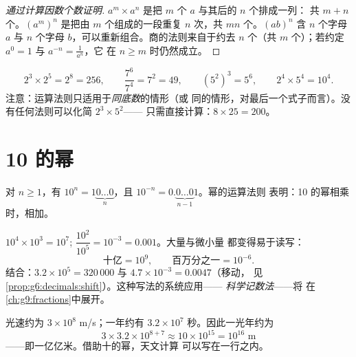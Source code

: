 \begin{proof}[通过计算因数个数证明]
$a^m \times a^n$ 是把 $m$ 个 $a$ 与其后的 $n$ 个排成一列：
共 $m + n$ 个。$\left(a^m\right)^n$ 是把由 $m$ 个组成的一段重复
$n$ 次，共 $mn$ 个。$(ab)^n$ 含 $n$ 个字母 $a$ 与 $n$
个字母 $b$，可以重新组合。商的法则来自于约去
$n$ 个（共 $m$ 个）；若约定
$a^0 = 1$ 与 $a^{-n} = \frac{1}{a^n}$，它
在 $n \geq m$ 时仍然成立。
\end{proof}

\begin{example}\label{ex:g8:powers:rules}
\[
2^3 \times 2^5 = 2^8 = 256,
\qquad
\frac{7^6}{7^4} = 7^2 = 49,
\qquad
\left(5^2\right)^3 = 5^6,
\qquad
2^4 \times 5^4 = 10^4 .
\]
注意：运算法则只适用于\emph{同底数}的情形（或
同的情形，对最后一个式子而言）。没有任何法则可以化简 $2^3 \times 5^2$——
只需直接计算：$8 \times 25 = 200$。
\end{example}

\section{10 的幂}

\begin{proposition}[10 的幂]\label{prop:g8:powers:ten}
对 $n \geq 1$，有 $10^n = 1\underbrace{0\dots0}_{n}$，且
$10^{-n} = 0.\underbrace{0\dots0}_{n-1}1$。幂的运算法则
表明：10 的幂相乘时，相加。
\end{proposition}

\begin{example}\label{ex:g8:powers:ten}
$10^4 \times 10^3 = 10^7$; \quad
$\dfrac{10^2}{10^5} = 10^{-3} = 0.001$。大量与微小量
都变得易于读写：
\[
\text{十亿} = 10^9,
\qquad
\text{百万分之一} = 10^{-6}.
\]
结合：$3.2 \times 10^5 = 320\,000$ 与
$4.7 \times 10^{-3} = 0.0047$（移动，
见\cref{prop:g6:decimals:shift}）。这种写法的系统应用——
\emph{科学记数法}——将
在\cref{ch:g9:fractions}中展开。
\end{example}

\begin{example}[数量级]\label{ex:g8:powers:magnitude}
光速约为 $3 \times 10^8$ m/s；一年约有
$3.2 \times 10^7$ 秒。因此一光年约为
\[
3 \times 3.2 \times 10^{8+7} \approx 10 \times 10^{15} = 10^{16}
\text{ m}
\]
——即一亿亿米。借助十的幂，天文计算
可以写在一行之内。
\end{example}

